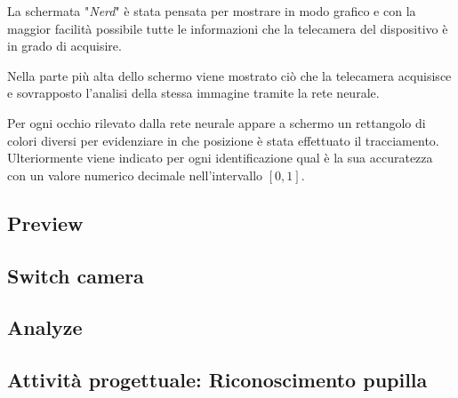 La schermata "\textit{Nerd}" è stata pensata per mostrare in modo grafico e con la maggior facilità possibile tutte le informazioni che la telecamera del dispositivo è in grado di acquisire.

Nella parte più alta dello schermo viene mostrato ciò che la telecamera acquisisce e sovrapposto l'analisi della stessa immagine tramite la rete neurale.

Per ogni occhio rilevato dalla rete neurale appare a schermo un rettangolo di colori diversi per evidenziare in che posizione è stata effettuato il tracciamento. Ulteriormente viene indicato per ogni identificazione qual è la sua accuratezza con un valore numerico decimale nell'intervallo $[0,1]$.

\subsection{Preview}
\label{sub:preview}


\subsection{Switch camera}
\label{sub:switchcamera}


\subsection{Analyze}
\label{sub:analyze}


\subsection{Attività progettuale: Riconoscimento pupilla}
\label{sub:riconoscimentopupilla}
